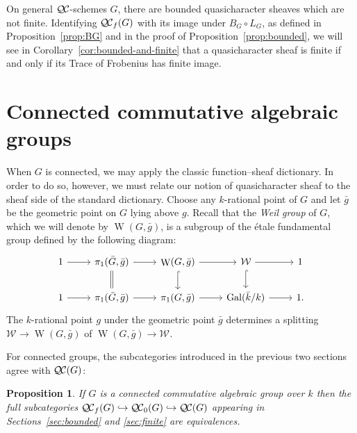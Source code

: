 \documentclass{amsart}
\theoremstyle{plain}
\newtheorem{proposition}[theorem]{Proposition}
\theoremstyle{definition}
\theoremstyle{remark}
\newcommand{\bFq}{\bar{k}}
\newcommand{\Fq}{k}
\newcommand{\Weil}[1]{\mathcal{W}_{#1}}
\DeclareMathOperator{\Gal}{Gal}
\DeclareMathOperator{\W}{W}
\newcommand{\QC}{{\mathcal{Q\hskip-0.8pt C}}}
\newcommand{\QCb}{{\QC_0}}
\newcommand{\QCf}{{\QC_f}}
\newcommand{\bg}{\bar{g}}
\newcommand{\bG}{\bar{G}}
\begin{document}
On general $\QC$-schemes $G$, there are bounded quasicharacter sheaves which are not finite.  Identifying
$\QCf(G)$ with its image under $B_G \circ L_G$, as defined in
Proposition~\ref{prop:BG} and in the proof of Proposition~\ref{prop:bounded},
we will see in Corollary~\ref{cor:bounded-and-finite} that
a quasicharacter sheaf is finite if and only if its Trace of Frobenius has finite image.

\section{Connected commutative algebraic groups} \label{sec:connected}

When $G$ is connected, we may apply the classic function--sheaf dictionary.  In order to do so,
however, we must relate our notion of quasicharacter sheaf to the sheaf side of the standard dictionary.
Choose any $\Fq$-rational point of $G$ and let $\bg$ be the geometric point on $G$ lying above $g$.
Recall that the \emph{Weil group} of $G$, which we will denote by $\W(G,\bg)$, is a subgroup of the \'etale
fundamental group defined by the following diagram:
\[
 \begin{tikzcd}
 1 \rar & \ar[equal]{d} \pi_1(\bG, \bg) \rar & \W(G,\bg) \rar \dar[hook] & \Weil{} \rar \dar[hook] & 1 \\
 1 \rar &  \pi_1(\bG, \bg) \rar & \pi_1(G,\bg) \rar & \Gal(\bFq/\Fq) \rar & 1.
 \end{tikzcd}
\]
The $\Fq$-rational point $g$ under the geometric point $\bg$ determines a splitting
$\Weil{}\to \W(G,\bg)$ of $\W(G,\bg)\to \Weil{}$.

For connected groups, the subcategories introduced in the previous two sections agree with $\QC(G)$:

\begin{proposition}\label{prop:connected}
  If $G$ is a connected commutative algebraic group over $\Fq$ then
  the full subcategories $\QCf(G) \hookrightarrow \QCb(G) \hookrightarrow \QC(G)$
  appearing in Sections~\ref{sec:bounded} and \ref{sec:finite} are equivalences.
\end{proposition}
\end{document}
